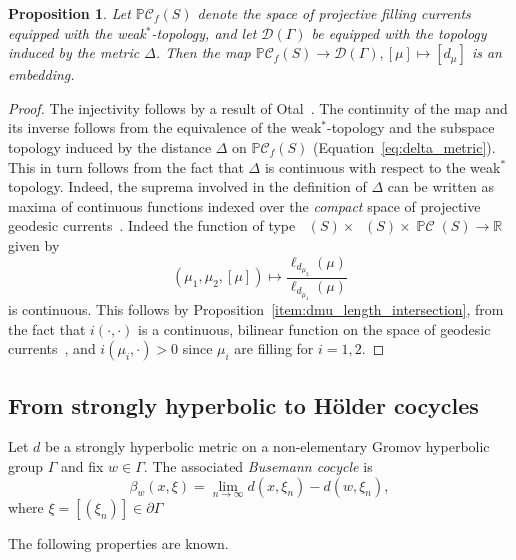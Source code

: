 \documentclass[12pt]{amsart}
\numberwithin{equation}{section}
\numberwithin{figure}{section}
\newtheorem{proposition}[equation]{Proposition}
\theoremstyle{definition}
\theoremstyle{plain}
\DeclareMathOperator{\PC}{\mathbb{P}\mathcal{C}}
\DeclareMathOperator{\Cf}{\mathcal{C}_{f}}
\begin{document}
\begin{proposition}
Let $\mathbb{P}\mathcal{C}_f(S)$ denote the space of projective filling currents equipped with the weak$^*$-topology, and let $\mathcal{D}(\Gamma)$ be equipped with the topology induced by the metric $\Delta$.
Then the map $\mathbb{P}\mathcal{C}_{f}(S) \to \mathcal{D}(\Gamma), [\mu] \mapsto [d_{\mu}]$ is an embedding.
\label{prop:embedding}
\end{proposition}
\begin{proof}
The injectivity follows by a result of Otal~\cite[Th\'eor\`eme~1]{Otal90:SpectreMarqueNegative}. The continuity of the map and its inverse follows from the equivalence of the weak$^*$-topology and the subspace topology induced by the distance $\Delta$ on $\mathbb{P}\mathcal{C}_f(S)$ (Equation~\eqref{eq:delta_metric}). This in turn follows from the fact that $\Delta$ is continuous with respect to the weak$^*$ topology. Indeed, the suprema involved in the definition of $\Delta$ can be written as maxima of continuous functions indexed over the \emph{compact} space of projective geodesic currents~\cite[Corollary~5]{Bonahon88:GeodesicCurrent}. Indeed the function of type $\Cf(S) \times \Cf(S) \times \PC(S) \to \mathbb{R}$ given by
\[
(\mu_1,\mu_2,[\mu]) \mapsto \frac{\ell_{d_{\mu_2}}(\mu)}{\ell_{d_{\mu_1}}(\mu)}
\]
is continuous.
This follows by Proposition~\ref{item:dmu_length_intersection}, from the fact that $i(\cdot, \cdot)$ is a continuous, bilinear function on the space of geodesic currents~\cite[Proposition~4.5]{Bonahon86:EndsHyperbolicManifolds}, and $i(\mu_i,\cdot)>0$ since $\mu_i$ are filling for $i=1,2$.
\end{proof}

\subsection{From strongly hyperbolic to H\"older cocycles}
\label{subsec:Holderocycle}

Let $d$ be a strongly hyperbolic metric on a non-elementary Gromov hyperbolic group $\Gamma$ and fix $w\in\Gamma$.
The associated \emph{Busemann cocycle} is
\[
\beta_w(x,\xi)
=
\lim_{n\to\infty}d(x,\xi_n)-d(w,\xi_n),
\]
where $\xi=[(\xi_n)]\in\partial\Gamma$

The following properties are known.
\end{document}

